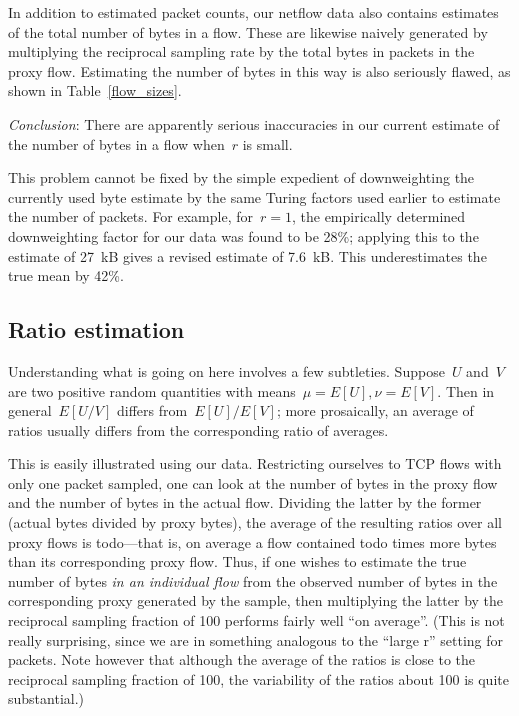 \documentclass{paper}
\begin{document}
In addition to estimated packet counts, our netflow data also contains estimates
of the total number of bytes in a flow. These are likewise naively generated by
multiplying the reciprocal sampling rate by the total bytes in packets in the
proxy flow. Estimating the number of bytes in this way is also seriously flawed,
as shown in Table~\ref{flow_sizes}.

\emph{Conclusion}: There are apparently serious inaccuracies in our current
estimate of the number of bytes in a flow when~$r$ is small.

This problem cannot be fixed by the simple expedient of downweighting the
currently used byte estimate by the same Turing factors used earlier to estimate
the number of packets. For example, for~$r = 1$, the empirically determined
downweighting factor for our data was found to be 28\%; applying this to the
estimate of 27~kB gives a revised estimate of 7.6~kB. This underestimates the
true mean by 42\%.

\subsection{Ratio estimation}

Understanding what is going on here involves a few subtleties. Suppose~$U$
and~$V$ are two positive random quantities with means~$\mu = E[U], \nu = E[V]$.
Then in general~$E[U/V]$ differs from~$E[U]/E[V]$; more prosaically, an average
of ratios usually differs from the corresponding ratio of averages.

This is easily illustrated using our data. Restricting ourselves to TCP flows
with only one packet sampled, one can look at the number of bytes in the proxy
flow and the number of bytes in the actual flow. Dividing the latter by the
former (actual bytes divided by proxy bytes), the average of the resulting
ratios over all proxy flows is todo---that is, on average a flow contained todo
times more bytes than its corresponding proxy flow. Thus, if one wishes to
estimate the true number of bytes \emph{in an individual flow} from the observed
number of bytes in the corresponding proxy generated by the sample, then
multiplying the latter by the reciprocal sampling fraction of 100 performs
fairly well ``on average''. (This is not really surprising, since we are in
something analogous to the ``large r'' setting for packets. Note however that
although the average of the ratios is close to the reciprocal sampling fraction
of 100, the variability of the ratios about 100 is quite substantial.)
\end{document}
